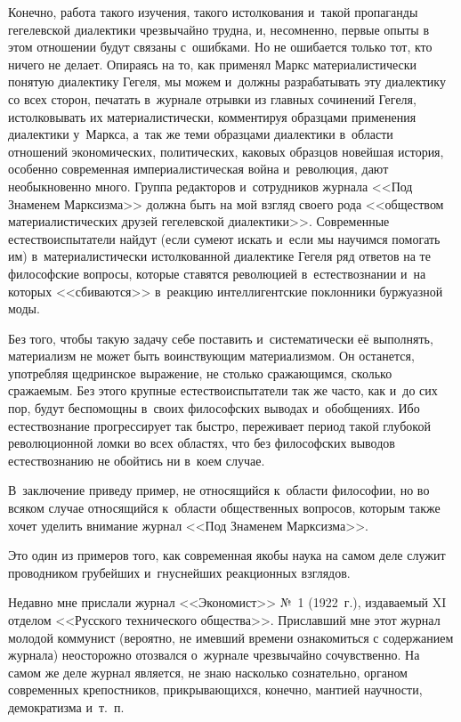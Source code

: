 Конечно, работа такого изучения, такого истолкования и~такой пропаганды
гегелевской диалектики чрезвычайно трудна, и, несомненно, первые опыты в
этом отношении будут связаны с~ошибками. Но не ошибается только тот, кто
ничего не делает. Опираясь на то, как применял Маркс материалистически
понятую диалектику Гегеля, мы можем и~должны разрабатывать эту диалектику
со всех сторон, печатать в~журнале отрывки из главных сочинений Гегеля,
истолковывать их материалистически, комментируя образцами применения
диалектики у~Маркса, а~так же теми образцами диалектики в~области отношений
экономических, политических, каковых образцов новейшая история, особенно
современная империалистическая война и~революция, дают необыкновенно много.
Группа редакторов и~сотрудников журнала <<Под Знаменем Марксизма>> должна
быть на мой взгляд своего рода <<обществом материалистических друзей
гегелевской диалектики>>. Современные естествоиспытатели найдут (если сумеют
искать и~если мы научимся помогать им) в~материалистически истолкованной
диалектике Гегеля ряд ответов на те философские вопросы, которые ставятся
революцией в~естествознании и~на которых <<сбиваются>> в~реакцию
интеллигентские поклонники буржуазной моды.

Без того, чтобы такую задачу себе поставить и~систематически её выполнять,
материализм не может быть воинствующим материализмом. Он останется,
употребляя щедринское выражение, не столько сражающимся, сколько сражаемым.
Без этого крупные естествоиспытатели так же часто, как и~до сих пор, будут
беспомощны в~своих философских выводах и~обобщениях. Ибо естествознание
прогрессирует так быстро, переживает период такой глубокой революционной
ломки во всех областях, что без философских выводов естествознанию не
обойтись ни в~коем случае.

В~заключение приведу пример, не относящийся к~области философии, но во
всяком случае относящийся к~области общественных вопросов, которым также
хочет уделить внимание журнал <<Под Знаменем Марксизма>>.

Это один из примеров того, как современная якобы наука на самом деле служит
проводником грубейших и~гнуснейших реакционных взглядов.

Недавно мне прислали журнал <<Экономист>> №~1 (1922~г.),
издаваемый XI отделом <<Русского технического общества>>. Приславший мне этот
журнал молодой коммунист (вероятно, не имевший времени ознакомиться с
содержанием журнала) неосторожно отозвался о~журнале чрезвычайно
сочувственно. На самом же деле журнал является, не знаю насколько
сознательно, органом современных крепостников, прикрывающихся, конечно,
мантией научности, демократизма и~т.~п.

